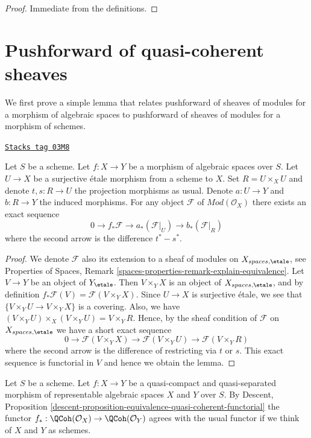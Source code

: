 \begin{proof}
Immediate from the definitions.
\end{proof}

\section{Pushforward of quasi-coherent sheaves}
\label{spaces-morphisms-section-pushforward}
We first prove a simple lemma that relates pushforward of sheaves of modules
for a morphism of algebraic spaces to pushforward of sheaves of modules for
a morphism of schemes.

\begin{lemma}
\label{spaces-morphisms-lemma-compute-pushforward}
\href{https://stacks.math.columbia.edu/tag/03M8}{\texttt{Stacks tag 03M8}}

Let $S$ be a scheme.
Let $f : X \to Y$ be a morphism of algebraic spaces over $S$.
Let $U \to X$ be a surjective \'etale morphism from a scheme to $X$.
Set $R = U \times_X U$ and denote $t, s : R \to U$ the projection
morphisms as usual. Denote $a : U \to Y$ and $b : R \to Y$ the induced
morphisms. For any object $\mathcal{F}$ of $\textit{Mod}(\mathcal{O}_X)$
there exists an exact sequence
$$
0 \to f_*\mathcal{F} \to a_*(\mathcal{F}|_U) \to b_*(\mathcal{F}|_R)
$$
where the second arrow is the difference $t^* - s^*$.
\end{lemma}

\begin{proof}
We denote $\mathcal{F}$ also its extension to a sheaf of modules on
$X_{spaces, \etale}$, see
Properties of Spaces,
Remark \ref{spaces-properties-remark-explain-equivalence}.
Let $V \to Y$ be an object of $Y_\etale$. Then $V \times_Y X$ is an
object of $X_{spaces, \etale}$, and by definition
$f_*\mathcal{F}(V) = \mathcal{F}(V \times_Y X)$. Since $U \to X$ is
surjective \'etale, we see that $\{V \times_Y U \to V \times_Y X\}$
is a covering. Also, we have
$(V \times_Y U) \times_X (V \times_Y U) = V \times_Y R$.
Hence, by the sheaf condition of $\mathcal{F}$ on
$X_{spaces, \etale}$ we have a short exact sequence
$$
0 \to \mathcal{F}(V \times_Y X)
\to \mathcal{F}(V \times_Y U) \to \mathcal{F}(V \times_Y R)
$$
where the second arrow is the difference of restricting via $t$ or $s$.
This exact sequence is functorial in $V$ and hence we obtain the lemma.
\end{proof}

Let $S$ be a scheme. Let $f : X \to Y$ be a quasi-compact and
quasi-separated morphism of representable algebraic spaces $X$
and $Y$ over $S$. By
Descent,
Proposition \ref{descent-proposition-equivalence-quasi-coherent-functorial}
the functor
$f_* : \QCoh(\mathcal{O}_X) \to \QCoh(\mathcal{O}_Y)$
agrees with the usual functor if we think of $X$ and $Y$ as schemes.

